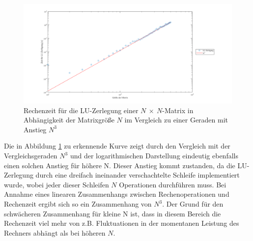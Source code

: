 \documentclass[a4paper, 10pt,onecolumn]{scrartcl}
\begin{document}
\begin{figure}[ht!]
	\centering
	\includegraphics[scale=0.4]{Zeit10.png}
	\caption{Rechenzeit für die LU-Zerlegung einer $N\ \times\ N$-Matrix in Abhängigkeit der Matrixgröße $N$ im Vergleich zu einer Geraden mit Anstieg $N^3$} 
	\label{Abbildung1}
\end{figure}

Die in Abbildung \ref{Abbildung1} zu erkennende Kurve zeigt durch den Vergleich mit der Vergleichsgeraden $N^3$ und der logarithmischen Darstellung eindeutig ebenfalls einen solchen Anstieg für höhere N. Dieser Anstieg kommt zustanden, da die LU-Zerlegung durch eine dreifach ineinander verschachtelte Schleife implementiert wurde, wobei jeder dieser Schleifen $N$ Operationen durchführen muss. Bei Annahme eines linearen Zusammenhangs zwischen Rechenoperationen und Rechenzeit ergibt sich so ein Zusammenhang von $N^3$.
Der Grund für den schwächeren Zusammenhang für kleine N ist, dass in diesem Bereich die Rechenzeit viel mehr von z.B. Fluktuationen in der momentanen Leistung des Rechners  abhängt als bei höheren $N$. 
\end{document}

